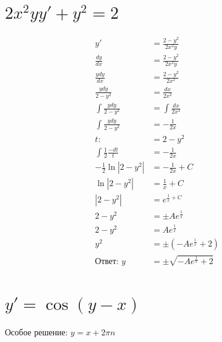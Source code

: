 

\cfoot{}



\section{$2x^2yy'+y^2=2$}

\begin{align*}
    y'                            & =\frac{2-y^2}{2x^2y}               \\[1em]
    \frac{dy}{dx}                 & = \frac{2-y^2}{2x^2y}              \\[1em]
    \frac{ydy}{dx}                & = \frac{2-y^2}{2x^2}               \\[1em]
    \frac{ydy}{2-y^2}             & = \frac{dx}{2x^2}                  \\[1em]
    \int \frac{ydy}{2-y^2}        & = \int \frac{dx}{2x^2}             \\[1em]
    \int \frac{ydy}{2-y^2}        & = -\frac{1}{2x}                    \\[1em]
    t:                            & =2-y^2                             \\[1em]
    \int \frac{1}{2}\frac{-dt}{t} & = -\frac{1}{2x}                    \\[1em]
    -\frac{1}{2}\ln|2-y^2|        & = -\frac{1}{2x} + C                \\[1em]
    \ln|2-y^2|                    & =\frac{1}{x} + C                   \\[1em]
    |2-y^2|                       & = e^{\frac{1}{x} + C}              \\[1em]
    2-y^2                         & = \pm A e^{\frac{1}{x}}            \\[1em]
    2-y^2                         & = A e^{\frac{1}{x}}                \\[1em]
    y^2                           & = \pm (-A e^{\frac{1}{x}} + 2)     \\[1em]
    \text{Ответ: } y              & = \pm\sqrt{-A e^{\frac{1}{x}} + 2}
\end{align*}

\section{$y'=\cos(y-x)$}

Особое решение: $y = x + 2\pi n$

